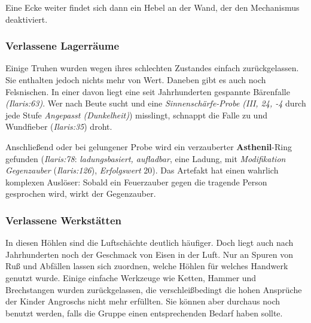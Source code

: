 \spaltenende


\spaltenanfang

Eine Ecke weiter findet sich dann ein Hebel an der Wand, der den Mechanismus deaktiviert.


\subsubsection{Verlassene Lagerräume}
Einige Truhen wurden wegen ihres schlechten Zustandes einfach zurückgelassen. 
Sie enthalten jedoch nichts mehr von Wert.
Daneben gibt es auch noch Felsnischen.
In einer davon liegt eine seit Jahrhunderten gespannte Bärenfalle \emph{(Ilaris:63)}.
Wer nach Beute sucht und eine \emph{Sinnenschärfe-Probe (III, 24, -4} durch jede Stufe \emph{Angepasst (Dunkelheit)}) misslingt, schnappt die Falle zu und Wundfieber (\emph{Ilaris:35}) droht.

Anschließend oder bei gelungener Probe wird ein verzauberter \textbf{Asthenil}-Ring gefunden (\emph{Ilaris:78}: \emph{ladungsbasiert, aufladbar}, eine Ladung,  mit \emph{Modifikation Gegenzauber} (\emph{Ilaris:126}), \emph{Erfolgswert} 20).
Das Artefakt hat einen wahrlich komplexen Auslöser:
Sobald ein Feuerzauber gegen die tragende Person gesprochen wird, wirkt der Gegenzauber.

\subsubsection{Verlassene Werkstätten}
In diesen Höhlen sind die Luftschächte deutlich häufiger. Doch liegt auch nach Jahrhunderten noch der Geschmack von Eisen in der Luft.
Nur an Spuren von Ruß und Abfällen lassen sich zuordnen, welche Höhlen für welches Handwerk genutzt wurde.
Einige einfache Werkzeuge wie Ketten, Hammer und Brechstangen wurden zurückgelassen, die verschleißbedingt die hohen Ansprüche der Kinder Angroschs nicht mehr erfüllten. Sie können aber durchaus noch benutzt werden, falls die Gruppe einen entsprechenden Bedarf haben sollte.

